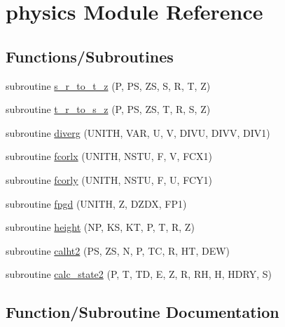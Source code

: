 \hypertarget{namespacephysics}{}\section{physics Module Reference}
\label{namespacephysics}
\subsection*{Functions/\+Subroutines}
\begin{DoxyCompactItemize}
\item 
subroutine \hyperlink{namespacephysics_a3f1959e7b3ff1a8d052f1e0441b1c379}{s\+\_\+r\+\_\+to\+\_\+t\+\_\+z} (P, PS, ZS, S, R, T, Z)
\item 
subroutine \hyperlink{namespacephysics_aebc42cd426e3ef8e85696bb1c7da18c3}{t\+\_\+r\+\_\+to\+\_\+s\+\_\+z} (P, PS, ZS, T, R, S, Z)
\item 
subroutine \hyperlink{namespacephysics_adc35216d512f6586071a79fba286a39c}{diverg} (U\+N\+I\+TH, V\+AR, U, V, D\+I\+VU, D\+I\+VV, D\+I\+V1)
\item 
subroutine \hyperlink{namespacephysics_a56a179b5bd2c13a2201b2367037a42cf}{fcorlx} (U\+N\+I\+TH, N\+S\+TU, F, V, F\+C\+X1)
\item 
subroutine \hyperlink{namespacephysics_a1f64bd544ea55c7fbbf5330725fc0896}{fcorly} (U\+N\+I\+TH, N\+S\+TU, F, U, F\+C\+Y1)
\item 
subroutine \hyperlink{namespacephysics_acf841366af6f4fd7502b4031a2cacb56}{fpgd} (U\+N\+I\+TH, Z, D\+Z\+DX, F\+P1)
\item 
subroutine \hyperlink{namespacephysics_a0ca41ce81224f2d7b292dc474c080c60}{height} (NP, KS, KT, P, T, R, Z)
\item 
subroutine \hyperlink{namespacephysics_a16ab28545ccd5528dd72f50208761dbe}{calht2} (PS, ZS, N, P, TC, R, HT, D\+EW)
\item 
subroutine \hyperlink{namespacephysics_a9197b79c7b8e6dfce5ecca360c320610}{calc\+\_\+state2} (P, T, TD, E, Z, R, RH, H, H\+D\+RY, S)
\end{DoxyCompactItemize}


\subsection{Function/\+Subroutine Documentation}
